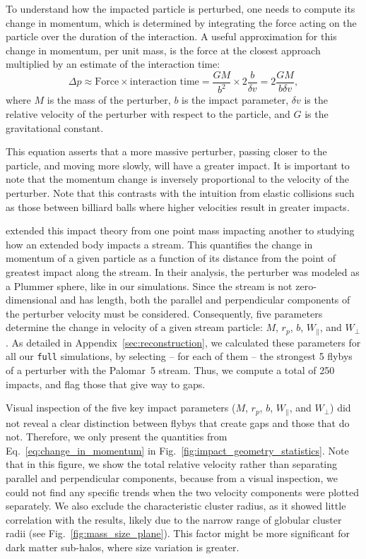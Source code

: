 \documentclass[draft]{aa}
\begin{document}
    To understand how the impacted particle is perturbed, one needs to compute its change in momentum, which is determined by integrating the force acting on the particle over the duration of the interaction. A useful approximation for this change in momentum, per unit mass, is the force at the closest approach multiplied by an estimate of the interaction time:
    \begin{equation} \label{eq:change_in_momentum} \Delta p \approx \text{Force} \times \text{interaction time} = \frac{GM}{b^2} \times 2\frac{b}{\delta v} = 2\frac{GM}{b \delta v}, \end{equation}where $M$ is the mass of the perturber, $b$ is the impact parameter, $\delta v$ is the relative velocity of the perturber with respect to the particle, and $G$ is the gravitational constant. 


    This equation asserts that a more massive perturber, passing closer to the particle, and moving more slowly, will have a greater impact. It is important to note that the momentum change is inversely proportional to the velocity of the perturber. Note that this contrasts with the intuition from elastic collisions such as those between billiard balls where higher velocities result in greater impacts.

    \citet{2015MNRAS.450.1136E} extended this impact theory from one point mass impacting another to studying how an extended body impacts a stream. This quantifies the change in momentum of a given particle as a function of its distance from the point of greatest impact along the stream. In their analysis, the perturber was modeled as a Plummer sphere, like in our simulations. Since the stream is not zero-dimensional and has length, both the parallel and perpendicular components of the perturber velocity must be considered. Consequently, five parameters determine the change in velocity of a given stream particle: $M$, $r_p$, $b$, $W_\parallel$, and $W_\perp$. As detailed in Appendix~\ref{sec:reconstruction}, we calculated these parameters for all our \texttt{full} simulations, by selecting -- for each of them --  the strongest 5 flybys of a perturber with the Palomar~5 stream. Thus, we compute a total of  250 impacts, and flag those that give way to gaps. 


    Visual inspection of the five key impact parameters ($M$, $r_p$, $b$, $W_\parallel$, and $W_\perp$) did not reveal a clear distinction between flybys that create gaps and those that do not. Therefore, we only present the quantities from Eq.~\ref{eq:change_in_momentum} in Fig.~\ref{fig:impact_geometry_statistics}. 
    Note that in this figure, we show the total relative velocity rather than separating parallel and perpendicular components, because from a visual inspection, we could not find any specific trends when the two velocity components were plotted separately. We also exclude the characteristic cluster radius, as it showed little correlation with the results, likely due to the narrow range of globular cluster radii (see Fig.~\ref{fig:mass_size_plane}). This factor might be more significant for dark matter sub-halos, where size variation is greater.
      
\end{document}
